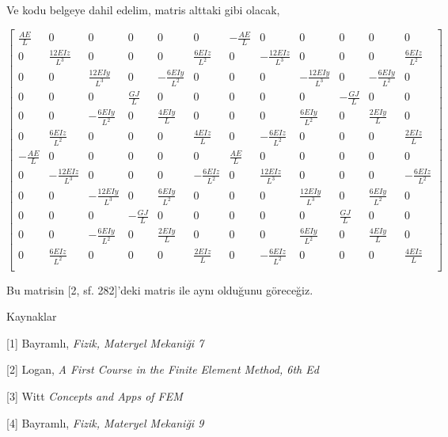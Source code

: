 \documentclass[12pt,fleqn]{article}\usepackage{../../common}
\begin{document}
Ve kodu belgeye dahil edelim, matris alttaki gibi olacak,

$$\left[\begin{array}{cccccccccccc}
\frac{A E}{L} & 0 & 0 & 0 & 0 & 0 & - \frac{A E}{L} & 0 & 0 & 0 & 0 & 0\\
0 & \frac{12 E Iz}{L^{3}} & 0 & 0 & 0 & \frac{6 E Iz}{L^{2}} & 0 & - \frac{12 E Iz}{L^{3}} & 0 & 0 & 0 & \frac{6 E Iz}{L^{2}}\\
0 & 0 & \frac{12 E Iy}{L^{3}} & 0 & - \frac{6 E Iy}{L^{2}} & 0 & 0 & 0 & - \frac{12 E Iy}{L^{3}} & 0 & - \frac{6 E Iy}{L^{2}} & 0\\
0 & 0 & 0 & \frac{G J}{L} & 0 & 0 & 0 & 0 & 0 & - \frac{G J}{L} & 0 & 0\\
0 & 0 & - \frac{6 E Iy}{L^{2}} & 0 & \frac{4 E Iy}{L} & 0 & 0 & 0 & \frac{6 E Iy}{L^{2}} & 0 & \frac{2 E Iy}{L} & 0\\
0 & \frac{6 E Iz}{L^{2}} & 0 & 0 & 0 & \frac{4 E Iz}{L} & 0 & - \frac{6 E Iz}{L^{2}} & 0 & 0 & 0 & \frac{2 E Iz}{L}\\
- \frac{A E}{L} & 0 & 0 & 0 & 0 & 0 & \frac{A E}{L} & 0 & 0 & 0 & 0 & 0\\
0 & - \frac{12 E Iz}{L^{3}} & 0 & 0 & 0 & - \frac{6 E Iz}{L^{2}} & 0 & \frac{12 E Iz}{L^{3}} & 0 & 0 & 0 & - \frac{6 E Iz}{L^{2}}\\
0 & 0 & - \frac{12 E Iy}{L^{3}} & 0 & \frac{6 E Iy}{L^{2}} & 0 & 0 & 0 & \frac{12 E Iy}{L^{3}} & 0 & \frac{6 E Iy}{L^{2}} & 0\\
0 & 0 & 0 & - \frac{G J}{L} & 0 & 0 & 0 & 0 & 0 & \frac{G J}{L} & 0 & 0\\
0 & 0 & - \frac{6 E Iy}{L^{2}} & 0 & \frac{2 E Iy}{L} & 0 & 0 & 0 & \frac{6 E Iy}{L^{2}} & 0 & \frac{4 E Iy}{L} & 0\\
0 & \frac{6 E Iz}{L^{2}} & 0 & 0 & 0 & \frac{2 E Iz}{L} & 0 & - \frac{6 E Iz}{L^{2}} & 0 & 0 & 0 & \frac{4 E Iz}{L}\\
\end{array}\right]$$

Bu matrisin [2, sf. 282]'deki matris ile aynı olduğunu göreceğiz.

Kaynaklar

[1] Bayramlı, {\em Fizik, Materyel Mekaniği 7}

[2] Logan, {\em A First Course in the Finite Element Method, 6th Ed}

[3] Witt {\em Concepts and Apps of FEM}

[4] Bayramlı, {\em Fizik, Materyel Mekaniği 9}
\end{document}
